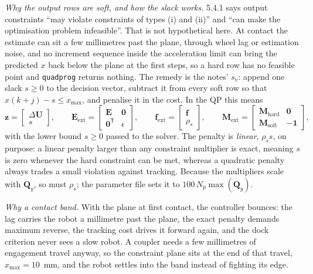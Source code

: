 \documentclass[11pt,a4paper]{article}
\newcommand{\vect}[1]{\bm{#1}}
\newcommand{\mat}[1]{\bm{#1}}
\newcommand{\T}{^{\mathsf{T}}}
\newcommand{\dU}{\Delta\vect{U}}
\newcommand{\Np}{N_p}
\newcommand{\ones}{\vect{1}}
\begin{document}
\emph{Why the output rows are soft, and how the slack works.} 5.4.1 says output constraints ``may violate constraints of types (i) and (ii)'' and ``can make the optimisation problem infeasible''. That is not hypothetical here. At contact the estimate can sit a few millimetres past the plane, through wheel lag or estimation noise, and no increment sequence inside the acceleration limit can bring the predicted $x$ back below the plane at the first steps, so a hard row has no feasible point and \texttt{quadprog} returns nothing. The remedy is the notes' $s_v$: append one slack $s\ge 0$ to the decision vector, subtract it from every soft row so that $x(k+j) - s\le x_{\max}$, and penalise it in the cost. In the QP this means
\begin{equation}
\vect z = \begin{bmatrix}\dU\\ s\end{bmatrix},\qquad
\mat E_{\mathrm{ext}} = \begin{bmatrix}\mat E & \vect 0\\ \vect 0\T & \epsilon\end{bmatrix},\qquad
\vect f_{\mathrm{ext}} = \begin{bmatrix}\vect f\\ \rho_s\end{bmatrix},\qquad
\mat M_{\mathrm{ext}} = \begin{bmatrix}\mat M_{\mathrm{hard}} & \vect 0\\ \mat M_{\mathrm{soft}} & -\ones\end{bmatrix},
\end{equation}
with the lower bound $s\ge 0$ passed to the solver. The penalty is \emph{linear}, $\rho_s s$, on purpose: a linear penalty larger than any constraint multiplier is exact, meaning $s$ is zero whenever the hard constraint can be met, whereas a quadratic penalty always trades a small violation against tracking. Because the multipliers scale with $\mat Q_y$, so must $\rho_s$; the parameter file sets it to $100\,\Np\max(\mat Q_y)$.

\emph{Why a contact band.} With the plane at first contact, the controller bounces: the lag carries the robot a millimetre past the plane, the exact penalty demands maximum reverse, the tracking cost drives it forward again, and the dock criterion never sees a slow robot. A coupler needs a few millimetres of engagement travel anyway, so the constraint plane sits at the end of that travel, $x_{\max} = 10$~mm, and the robot settles into the band instead of fighting its edge.
\end{document}
